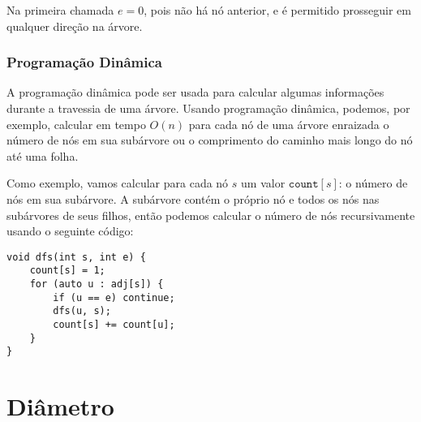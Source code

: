 Na primeira chamada $e=0$, pois não há nó anterior, e é permitido prosseguir em qualquer direção na árvore.

\subsubsection{Programação Dinâmica}

A programação dinâmica pode ser usada para calcular algumas informações durante a travessia de uma árvore. Usando programação dinâmica, podemos, por exemplo, calcular em tempo $O(n)$ para cada nó de uma árvore enraizada o número de nós em sua subárvore ou o comprimento do caminho mais longo do nó até uma folha.

Como exemplo, vamos calcular para cada nó $s$ um valor $\texttt{count}[s]$: o número de nós em sua subárvore. A subárvore contém o próprio nó e todos os nós nas subárvores de seus filhos, então podemos calcular o número de nós recursivamente usando o seguinte código:

\begin{lstlisting}
void dfs(int s, int e) {
    count[s] = 1;
    for (auto u : adj[s]) {
        if (u == e) continue;
        dfs(u, s);
        count[s] += count[u];
    }
}
\end{lstlisting}

\section{Diâmetro}


